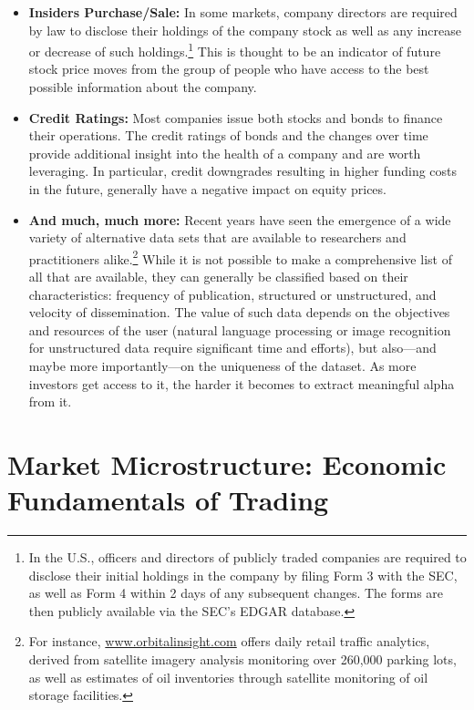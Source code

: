 \begin{itemize}
\item \textbf{Insiders Purchase/Sale:} In some markets, company directors are required by law to disclose their holdings of the company stock as well as any increase or decrease of such holdings.\footnote{In the U.S., officers and directors of publicly traded companies are required to disclose their initial holdings in the company by filing Form 3 with the SEC, as well as Form 4 within 2 days of any subsequent changes. The forms are then publicly available via the SEC's EDGAR database.} This is thought to be an indicator of future stock price moves from the group of people who have access to the best possible information about the company.


\item \textbf{Credit Ratings:} Most companies issue both stocks and bonds to finance their operations. The credit ratings of bonds and the changes over time provide additional insight into the health of a company and are worth leveraging. In particular, credit downgrades resulting in higher funding costs in the future, generally have a negative impact on equity prices.


\item \textbf{And much, much more:} Recent years have seen the emergence of a wide variety of alternative data sets that are available to researchers and practitioners alike.\footnote{For instance, \url{www.orbitalinsight.com} offers daily retail traffic analytics, derived from satellite imagery analysis monitoring over 260,000 parking lots, as well as estimates of oil inventories through satellite monitoring of oil storage facilities.} While it is not possible to make a comprehensive list of all that are available, they can generally be classified based on their characteristics: frequency of publication, structured or unstructured, and velocity of dissemination. The value of such data depends on the objectives and resources of the user (natural language processing or image recognition for unstructured data require significant time and efforts), but also---and maybe more importantly---on the uniqueness of the dataset. As more investors get access to it, the harder it becomes to extract meaningful alpha from it. \label{in:data_related2}
\end{itemize}


\section{Market Microstructure: Economic Fundamentals of Trading}\label{in:fund_trade3}\label{in:bidask1}\label{in:micro1}

